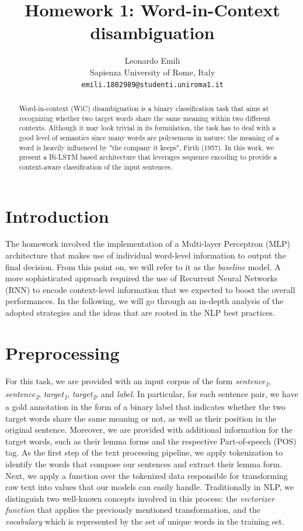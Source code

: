 \documentclass[11pt,a4paper]{article}
\title{Homework 1: Word-in-Context disambiguation}
\author{Leonardo Emili \\
  Sapienza University of Rome, Italy \\
  \texttt{emili.1802989@studenti.uniroma1.it}}
\date{}
\begin{document}
\maketitle
\begin{abstract}
  Word-in-context (WiC) disambiguation is a binary classification task that aims at recognizing whether two target words share the same meaning within two different contexts. Although it may look trivial in its formulation, the task has to deal with a good level of semantics since many words are polysemous in nature: the meaning of a word is heavily influenced by "the company it keeps", Firth (1957). In this work, we present a Bi-LSTM based architecture that leverages sequence encoding to provide a context-aware classification of the input sentences.
\end{abstract}

\section{Introduction}

The homework involved the implementation of a Multi-layer Perceptron (MLP) architecture that makes use of individual word-level information to output the final decision. From this point on, we will refer to it as the \emph{baseline} model. A more sophisticated approach required the use of Recurrent Neural Networks (RNN) to encode context-level information that we expected to boost the overall performances. In the following, we will go through an in-depth analysis of the adopted strategies and the ideas that are rooted in the NLP best practices.

\section{Preprocessing}

For this task, we are provided with an input corpus of the form \emph{sentence\textsubscript{1}}, \emph{sentence\textsubscript{2}}, \emph{target\textsubscript{1}}, \emph{target\textsubscript{2}}, and \emph{label}. In particular, for each sentence pair, we have a gold annotation in the form of a binary label that indicates whether the two target words share the same meaning or not, as well as their position in the original sentence. Moreover, we are provided with additional information for the target words, such as their lemma forms and the respective Part-of-speech (POS) tag. As the first step of the text processing pipeline, we apply tokenization to identify the words that compose our sentences and extract their lemma form. Next, we apply a function over the tokenized data responsible for transforming raw text into values that our models can easily handle. Traditionally in NLP, we distinguish two well-known concepts involved in this process: the \emph{vectorizer function} that applies the previously mentioned transformation, and the \emph{vocabulary} which is represented by the set of unique words in the training set.
\end{document}
